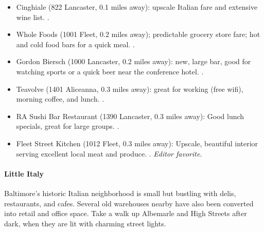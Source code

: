\begin{itemize}
\item{Cinghiale (822 Lancaster, 0.1 miles away): upscale Italian fare and extensive wine list. \industry.}
\item{Whole Foods (1001 Fleet, 0.2 miles away); predictable grocery store fare; hot and cold food bars for a quick meal. \gradstudent.}
\item{Gordon Biersch (1000 Lancaster, 0.2 miles away): new, large bar, good for watching sports or a quick beer near the conference hotel. \postdoc.}
\item{Teavolve (1401 Aliceanna, 0.3 miles away): great for working (free wifi), morning coffee, and lunch. \gradstudent.}
\item{RA Sushi Bar Restaurant (1390 Lancaster, 0.3 miles away): Good lunch specials, great for large groups. \postdoc.} 
\item{Fleet Street Kitchen (1012 Fleet, 0.3 miles away): Upscale, beautiful interior serving excellent local meat and produce. \professor. \it{Editor favorite}.}
\end{itemize}

\paragraph*{Little Italy}
Baltimore's historic Italian neighborhood is small but bustling with delis, restaurants, and cafes. Several old warehouses nearby have also been converted into retail and office space. Take a walk up Albemarle and High Streets after dark, when they are lit with charming street lights.

